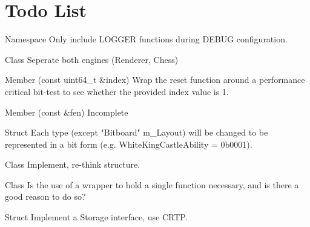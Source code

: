 \chapter{Todo List}
\hypertarget{todo}{}\label{todo}

\begin{DoxyRefList}
\item[Namespace \doxylink{namespace_application}{Application} ]\label{todo__todo000010}%
%
Only include LOGGER functions during DEBUG configuration.  
\item[Class \doxylink{class_application_1_1_engine}{Application\+::Engine} ]\label{todo__todo000008}%
%
Seperate both engines (Renderer, Chess) 
\item[Member \doxylink{class_chess_1_1_bitboard_ae470b7ba8cca1f83b086bf4834236a5d}{Chess\+::Bitboard\+::Reset\+Impl} (const uint64\+\_\+t \&index)]\label{todo__todo000001}%
%
Wrap the reset function around a performance critical bit-\/test to see whether the provided index value is 1.  
\item[Member \doxylink{class_chess_1_1_board_a15ee7b2a52ae08f051407d336110fcea}{Chess\+::Board\+::Populate} (const \doxylink{class_chess_1_1_fen_string}{Fen\+String} \&fen)]\label{todo__todo000006}%
%
Incomplete  
\item[Struct \doxylink{struct_chess_1_1_board_components}{Chess\+::Board\+Components} ]\label{todo__todo000002}%
%
Each type (except "{}\+Bitboard"{} m\+\_\+\+Layout) will be changed to be represented in a bit form (e.\+g. White\+King\+Castle\+Ability = 0b0001).  
\item[Class \doxylink{class_chess_1_1_evaluation}{Chess\+::Evaluation} ]\label{todo__todo000007}%
%
Implement, re-\/think structure.  
\item[Class \doxylink{class_chess_1_1_fen_string}{Chess\+::Fen\+String} ]\label{todo__todo000003}%
%
Is the use of a wrapper to hold a single function necessary, and is there a good reason to do so?  
\item[Struct \doxylink{struct_e_c_s_1_1_storage_traits}{ECS\+::Storage\+Traits\texorpdfstring{$<$}{<} Type, Entity \texorpdfstring{$>$}{>}} ]\label{todo__todo000011}%
%
Implement a Storage interface, use CRTP. 




\end{DoxyRefList}
